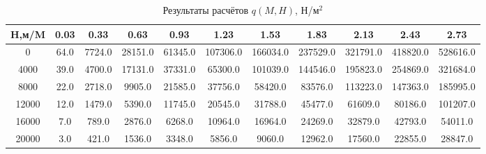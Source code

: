 \begin{table}[H]
\centering
\caption{Результаты расчётов $q(M,H)$, Н/м$^2$}
\label{q}
\begin{tabular}{|c|c|c|c|c|c|c|c|c|c|c|}
\toprule
H,м/M &  0.03 &    0.33 &     0.63 &     0.93 &      1.23 &      1.53 &      1.83 &      2.13 &      2.43 &      2.73 \\
\midrule
0     &  64.0 &  7724.0 &  28151.0 &  61345.0 &  107306.0 &  166034.0 &  237529.0 &  321791.0 &  418820.0 &  528616.0 \\
4000  &  39.0 &  4700.0 &  17131.0 &  37331.0 &   65300.0 &  101039.0 &  144546.0 &  195823.0 &  254869.0 &  321684.0 \\
8000  &  22.0 &  2718.0 &   9905.0 &  21585.0 &   37756.0 &   58420.0 &   83576.0 &  113223.0 &  147363.0 &  185995.0 \\
12000 &  12.0 &  1479.0 &   5390.0 &  11745.0 &   20545.0 &   31788.0 &   45477.0 &   61609.0 &   80186.0 &  101207.0 \\
16000 &   7.0 &   789.0 &   2876.0 &   6268.0 &   10964.0 &   16964.0 &   24269.0 &   32879.0 &   42793.0 &   54011.0 \\
20000 &   3.0 &   421.0 &   1536.0 &   3348.0 &    5856.0 &    9060.0 &   12962.0 &   17560.0 &   22855.0 &   28847.0 \\
\bottomrule
\end{tabular}
\end{table}

